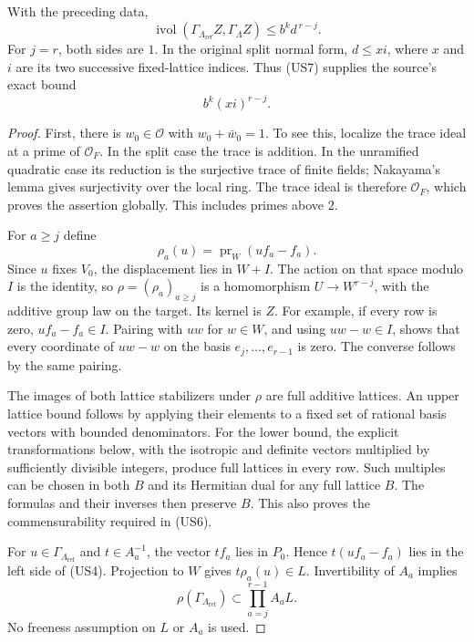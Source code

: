 \begin{theorem}
\label{thm:middle-unipotent-stabilizer}
With the preceding data,
\[
 \operatorname{ivol}
       (\Gamma_{\Lambda_{\mathrm{ref}}}Z,\Gamma_\Lambda Z)
                         \leq b^k d^{\,r-j}.
 \tag{US7}
\]
For $j=r$, both sides are $1$.  In the original split normal
form, $d\leq xi$, where $x$ and $i$ are its two successive
fixed-lattice indices.  Thus (US7) supplies the source's exact
bound
\[
                         b^k(xi)^{r-j}.
 \tag{US8}
\]
\end{theorem}

\begin{proof}
First, there is $w_0\in\mathcal O$ with $w_0+\bar w_0=1$.
To see this, localize the trace ideal at a prime of
$\mathcal O_F$.  In the split case the trace is addition.
In the unramified quadratic case its reduction is the
surjective trace of finite fields; Nakayama's lemma gives
surjectivity over the local ring.  The trace ideal is
therefore $\mathcal O_F$, which proves the assertion
globally.  This includes primes above $2$.

For $a\geq j$ define
\[
             \rho_a(u)=\operatorname{pr}_W(uf_a-f_a).
\]
Since $u$ fixes $V_0$, the displacement lies in $W+I$.
The action on that space modulo $I$ is the identity, so
$\rho=(\rho_a)_{a\geq j}$ is a homomorphism
$U\to W^{r-j}$, with the additive group law on the target.
Its kernel is $Z$.  For example, if every row is zero,
$uf_a-f_a\in I$.  Pairing with $uw$ for $w\in W$, and
using $uw-w\in I$, shows that every coordinate of
$uw-w$ on the basis $e_j,\ldots,e_{r-1}$ is zero.
The converse follows by the same pairing.

The images of both lattice stabilizers under $\rho$ are
full additive lattices.  An upper lattice bound follows by
applying their elements to a fixed set of rational basis
vectors with bounded denominators.  For the lower bound,
the explicit transformations below, with the isotropic and
definite vectors multiplied by sufficiently divisible
integers, produce full lattices in every row.  Such multiples
can be chosen in both $B$ and its Hermitian dual for any
full lattice $B$.  The formulas and their inverses then
preserve $B$.  This also proves the commensurability required
in (US6).

For $u\in\Gamma_{\Lambda_{\mathrm{ref}}}$ and
$t\in A_a^{-1}$, the vector $tf_a$ lies in $P_0$.
Hence $t(uf_a-f_a)$ lies in the left side of (US4).
Projection to $W$ gives $t\rho_a(u)\in L$.  Invertibility
of $A_a$ implies
\[
 \rho(\Gamma_{\Lambda_{\mathrm{ref}}})
                         \subset\prod_{a=j}^{r-1}A_aL.
 \tag{US9}
\]
No freeness assumption on $L$ or $A_a$ is used.


\end{proof}
